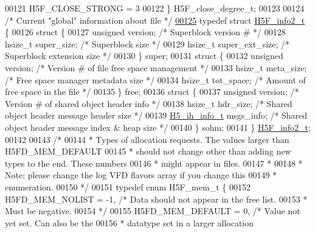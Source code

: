\begin{DoxyCode}
00121     H5F\_CLOSE\_STRONG    = 3
00122 \} H5F\_close\_degree\_t;
00123 
00124 \textcolor{comment}{/* Current "global" information about file */}
\hyperlink{struct_h5_f__info2__t}{00125} \textcolor{keyword}{typedef} \textcolor{keyword}{struct }\hyperlink{struct_h5_f__info2__t}{H5F\_info2\_t} \{
00126     \textcolor{keyword}{struct }\{
00127     \textcolor{keywordtype}{unsigned}    version;    \textcolor{comment}{/* Superblock version # */}
00128     hsize\_t     super\_size; \textcolor{comment}{/* Superblock size */}
00129     hsize\_t     super\_ext\_size; \textcolor{comment}{/* Superblock extension size */}
00130     \} super;
00131     \textcolor{keyword}{struct }\{
00132     \textcolor{keywordtype}{unsigned}    version;    \textcolor{comment}{/* Version # of file free space management */}
00133     hsize\_t     meta\_size;  \textcolor{comment}{/* Free space manager metadata size */}
00134     hsize\_t     tot\_space;  \textcolor{comment}{/* Amount of free space in the file */}
00135     \} free;
00136     \textcolor{keyword}{struct }\{
00137     \textcolor{keywordtype}{unsigned}    version;    \textcolor{comment}{/* Version # of shared object header info */}
00138     hsize\_t     hdr\_size;       \textcolor{comment}{/* Shared object header message header size */}
00139     \hyperlink{struct_h5__ih__info__t}{H5\_ih\_info\_t}    msgs\_info;      \textcolor{comment}{/* Shared object header message index & heap size */}
00140     \} sohm;
00141 \} \hyperlink{struct_h5_f__info2__t}{H5F\_info2\_t};
00142 
00143 \textcolor{comment}{/*}
00144 \textcolor{comment}{ * Types of allocation requests. The values larger than H5FD\_MEM\_DEFAULT}
00145 \textcolor{comment}{ * should not change other than adding new types to the end. These numbers}
00146 \textcolor{comment}{ * might appear in files.}
00147 \textcolor{comment}{ *}
00148 \textcolor{comment}{ * Note: please change the log VFD flavors array if you change this}
00149 \textcolor{comment}{ * enumeration.}
00150 \textcolor{comment}{ */}
00151 \textcolor{keyword}{typedef} \textcolor{keyword}{enum} H5F\_mem\_t \{
00152     H5FD\_MEM\_NOLIST     = -1,   \textcolor{comment}{/* Data should not appear in the free list.}
00153 \textcolor{comment}{                                 * Must be negative.}
00154 \textcolor{comment}{                                 */}
00155     H5FD\_MEM\_DEFAULT    = 0,    \textcolor{comment}{/* Value not yet set.  Can also be the}
00156 \textcolor{comment}{                                 * datatype set in a larger allocation}

\end{DoxyCode}
